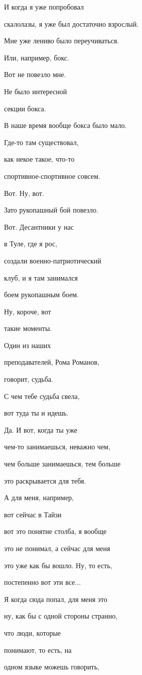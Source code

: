 И когда я уже попробовал

скалолазы, я уже был достаточно взрослый.

Мне уже лениво было переучиваться.

Или, например, бокс.

Вот не повезло мне.

Не было интересной

секции бокса.

В наше время вообще бокса было мало.

Где-то там существовал,

как некое такое, что-то

спортивное-спортивное совсем.

Вот. Ну, вот.

Зато рукопашный бой повезло.

Вот. Десантники у нас

в Туле, где я рос,

создали военно-патриотический

клуб, и я там занимался

боем рукопашным боем.

Ну, короче, вот

такие моменты.

Один из наших

преподавателей, Рома Романов,

говорит, судьба.

С чем тебе судьба свела,

вот туда ты и идешь.

Да. И вот, когда ты уже

чем-то занимаешься, неважно чем,

чем больше занимаешься, тем больше

это раскрывается для тебя.

А для меня, например,

вот сейчас в Тайзи

вот это понятие столба, я вообще

это не понимал, а сейчас для меня

это уже как бы вошло. Ну, то есть,

постепенно вот эти все...

Я когда сюда попал, для меня это

ну, как бы с одной стороны странно,

что люди, которые

понимают, то есть, на

одном языке можешь говорить,

